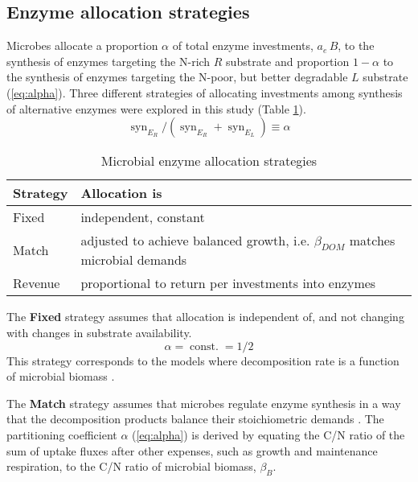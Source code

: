 \subsection{ Enzyme allocation strategies} 
\label{sec:AllocStrategies}

Microbes allocate a proportion $\alpha$ of total enzyme investments, $a_e\,B$,
to the synthesis of enzymes targeting the N-rich $R$ substrate and proportion $1
- \alpha$ to the synthesis of enzymes targeting the N-poor, but better
degradable $L$ substrate (\ref{eq:alpha}). Three different strategies of
allocating investments among synthesis of alternative enzymes were explored in this study (Table
\ref{tab:AllocStrategies}).
\begin{equation} 
\label{eq:alpha}
\operatorname{syn}_{E_R} /
(\operatorname{syn}_{E_R} + \operatorname{syn}_{E_L}) \equiv \alpha
\end{equation}

\begin{table}[t]
\caption{Microbial enzyme allocation strategies \label{tab:AllocStrategies}}
\vskip4mm
\centering
\begin{tabular}{lp{6.5cm}}
\hline
Strategy &  Allocation is \\
\hline
Fixed & independent, constant \\
Match & adjusted to achieve balanced growth, i.e. $\beta_{DOM}$ matches
microbial demands  \\
Revenue & proportional to return per investments into enzymes \\
\hline
\end{tabular}
\end{table}


The \textbf{Fixed} strategy assumes that allocation is independent of,
and not changing with changes in substrate availability.
\begin{equation} 
\label{eq:allocFixed}
\alpha = \operatorname{const.} = 1/2
\end{equation}
This strategy corresponds to the models where decomposition rate is a function
of microbial biomass \citep{Wutzler08}.
 
The \textbf{Match} strategy assumes that microbes regulate enzyme synthesis in a
way that the decomposition products balance their stoichiometric demands
\citep{Moorhead12}. The partitioning coefficient $\alpha$ (\ref{eq:alpha}) is
derived by equating the C/N ratio of the sum of uptake fluxes after
other expenses, such as growth and maintenance respiration, to the
C/N ratio of microbial biomass, $\beta_B$.

